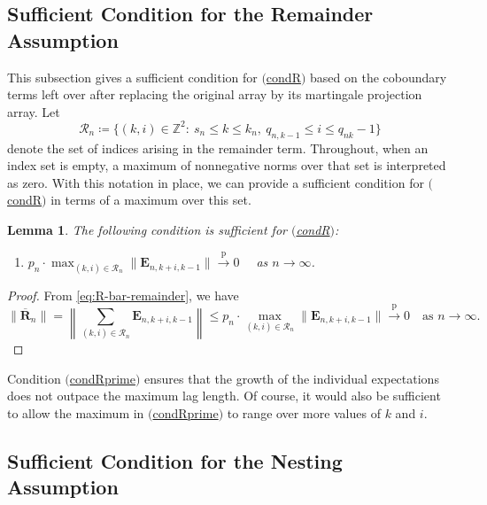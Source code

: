 \documentclass[11pt]{article}
\renewcommand\vec[1]{\boldsymbol{#1}}
\newcommand{\Z}{\mathbb{Z}}
\newcommand{\RR}{\mathcal{R}}
\newcommand{\labeleditem}[1]{%
  \item[$\mathrm{(}$\csname cond#1\endcsname$\mathrm{)}$]%
  \hypertarget{cond:#1}{}%
}
\newcommand{\refitem}[1]{$\mathrm{(}$\hyperlink{cond:#1}{\csname cond#1\endcsname}$\mathrm{)}$}
\newcommand{\pconverge}{\overset{\mathrm{p}}{\to}}
\newtheorem{lemma}{Lemma}
\theoremstyle{definition}
\begin{document}
\subsection{Sufficient Condition for the Remainder Assumption}\label{sec:remaining-sufficient}

This subsection gives a sufficient condition for \refitem{R} based on the coboundary terms left over after replacing the original array by its martingale projection array.
Let
\[
\RR_n \coloneqq \{(k, i) \in \Z^2:\ s_n \leq k \leq k_n,\ q_{n,k-1} \leq i \leq q_{nk}-1\}
\]
denote the set of indices arising in the remainder term.
Throughout, when an index set is empty, a maximum of nonnegative norms over that set is interpreted as zero.
With this notation in place, we can provide a sufficient condition for \refitem{R} in terms of a maximum over this set.

\begin{lemma}\label{lemma:remainder-sufficient}
    The following condition is sufficient for \refitem{R}:
    \begin{enumerate}
        \labeleditem{Rprime} $p_n \cdot \max_{(k, i) \in \RR_n} \|\vec{E}_{n,k+i,k-1}\| \pconverge 0 \quad$ as $n \to \infty$.
    \end{enumerate}
\end{lemma}

\begin{proof}  
From \eqref{eq:R-bar-remainder}, we have
\[
\|\overline{\vec{R}}_n\|
= \left\|\sum_{(k,i) \in \RR_n} \vec{E}_{n,k+i,k-1}\right\|
\leq p_n \cdot \max_{(k, i) \in \RR_n} \|\vec{E}_{n,k+i,k-1}\| \pconverge 0 \quad\text{as } n \to \infty.
\]
\end{proof}

Condition \refitem{Rprime} ensures that the growth of the individual expectations does not outpace the maximum lag length.
Of course, it would also be sufficient to allow the maximum in \refitem{Rprime} to range over more values of $k$ and $i$.

\subsection{Sufficient Condition for the Nesting Assumption}\label{sec:nesting-sufficient}
\end{document}
